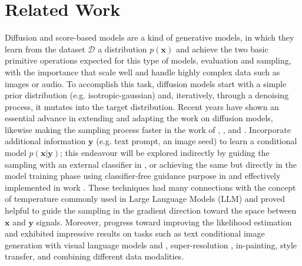\section{Related Work}


Diffusion \citep{sohldickstein2015deep} \citep{ho2020denoising} and score-based models \citep{song2020generative} are a kind of generative models, in which they learn from the dataset $\mathcal{D}$ a distribution $p(\mathbf{x})$ and achieve the two basic primitive operations expected for this type of models, evaluation and sampling, with the importance that scale well and handle highly complex data such as images or audio. To accomplish this task, diffusion models start with a simple prior distribution (e.g. isotropic-gaussian) and, iteratively, through a denoising process, it mutates into the target distribution. Recent years have shown an essential advance in extending and adapting the work on diffusion models, likewise making the sampling process faster in the work of \cite{song2020denoising}, \cite{nichol2021improved}, and \cite{Salimans2022ProgressiveDF}. Incorporate additional information $\mathbf{y}$ (e.g. text prompt, an image seed) to learn a conditional model $p(\mathbf{x} | \mathbf{y})$; this endeavour will be explored indirectly by guiding the sampling with an external classifier in \cite{Dhariwal2021DiffusionMB}, or achieving the same but directly in the model training phase using classifier-free guidance purpose in \cite{Ho2022ClassifierFreeDG} and effectively implemented in work \cite{nichol2022glide}. These techniques had many connections with the concept of temperature commonly used in Large Language Models (LLM) and proved helpful to guide the sampling in the gradient direction toward the space between $\mathbf{x}$ and $\mathbf{y}$ signals. Moreover, progress toward improving the likelihood estimation and exhibited impressive results on tasks such as text conditional image generation with visual language models \cite{ramesh2022hierarchical} and \cite{saharia2022photorealistic}, super-resolution \cite{ho2021cascaded}, in-painting, style transfer, and combining different data modalities. \\

